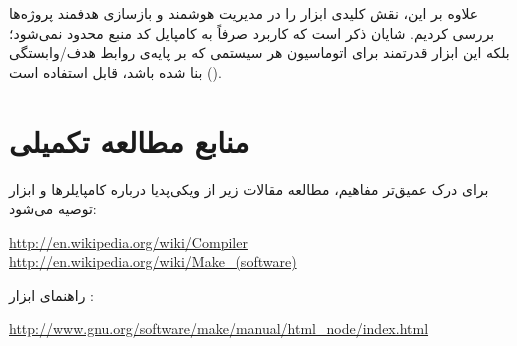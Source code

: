 علاوه بر این، نقش کلیدی ابزار  را در مدیریت هوشمند و بازسازی هدفمند پروژه‌ها بررسی کردیم. شایان ذکر است که کاربرد  صرفاً به کامپایل کد منبع محدود نمی‌شود؛ بلکه این ابزار قدرتمند برای اتوماسیون هر سیستمی که بر پایه‌ی روابط هدف/وابستگی () بنا شده باشد، قابل استفاده است.

\section{منابع مطالعه تکمیلی}

برای درک عمیق‌تر مفاهیم، مطالعه مقالات زیر از ویکی‌پدیا درباره کامپایلرها و ابزار  توصیه می‌شود:

\begin{latin}
\url{http://en.wikipedia.org/wiki/Compiler}\\
\url{http://en.wikipedia.org/wiki/Make_(software)}
\end{latin}

راهنمای ابزار :

\begin{latin}
\url{http://www.gnu.org/software/make/manual/html_node/index.html}
\end{latin}